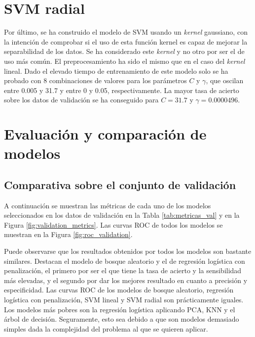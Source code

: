 \documentclass[12pt,a4paper,]{book}
\numberwithin{dummy}{section}
\theoremstyle{ocrenumbox}
\theoremstyle{blacknumex}
\theoremstyle{blacknumbox}
\theoremstyle{ocrenum}
\theoremstyle{ocrenum}
\begin{document}
\hypertarget{svm-radial}{%
\section{SVM radial}\label{svm-radial}}

Por último, se ha construido el modelo de SVM usando un \emph{kernel}
gaussiano, con la intención de comprobar si el uso de esta función
kernel es capaz de mejorar la separabilidad de los datos. Se ha
considerado este \emph{kernel} y no otro por ser el de uso más común. El
preprocesamiento ha sido el mismo que en el caso del \emph{kernel}
lineal. Dado el elevado tiempo de entrenamiento de este modelo solo se
ha probado con 8 combinaciones de valores para los parámetros \(C\) y
\(\gamma\), que oscilan entre 0.005 y 31.7 y entre 0 y 0.05,
respectivamente. La mayor tasa de acierto sobre los datos de validación
se ha conseguido para \(C = 31.7\) y \(\gamma = 0.0000496\).

\hypertarget{evaluaciuxf3n-y-comparaciuxf3n-de-modelos}{%
\section{Evaluación y comparación de
modelos}\label{evaluaciuxf3n-y-comparaciuxf3n-de-modelos}}

\hypertarget{comparativa-sobre-el-conjunto-de-validaciuxf3n}{%
\subsection{Comparativa sobre el conjunto de
validación}\label{comparativa-sobre-el-conjunto-de-validaciuxf3n}}

A continuación se muestran las métricas de cada uno de los modelos
seleccionados en los datos de validación en la Tabla
\ref{tab:metricas_val} y en la Figura \ref{fig:validation_metrics}. Las
curvas ROC de todos los modelos se muestran en la Figura
\ref{fig:roc_validation}.

Puede observarse que los resultados obtenidos por todos los modelos son
bastante similares. Destacan el modelo de bosque aleatorio y el de
regresión logística con penalización, el primero por ser el que tiene la
tasa de acierto y la sensibilidad más elevadas, y el segundo por dar los
mejores resultado en cuanto a precisión y especificidad. Las curvas ROC
de los modelos de bosque aleatorio, regresión logística con
penalización, SVM lineal y SVM radial son prácticamente iguales. Los
modelos más pobres son la regresión logística aplicando PCA, KNN y el
árbol de decisión. Seguramente, esto sea debido a que son modelos
demasiado simples dada la complejidad del problema al que se quieren
aplicar.
\end{document}
